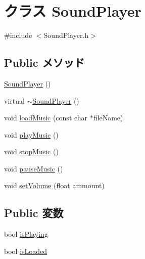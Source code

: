 \hypertarget{class_sound_player}{\section{クラス Sound\-Player}
\label{class_sound_player}
}


{\ttfamily \#include $<$Sound\-Player.\-h$>$}

\subsection*{Public メソッド}
\begin{DoxyCompactItemize}
\item 
\hyperlink{class_sound_player_ac7107aecd54bdcfac29486487768ebc6}{Sound\-Player} ()
\item 
virtual \hyperlink{class_sound_player_a581b10975ea64b87b84b7471b814c7ef}{$\sim$\-Sound\-Player} ()
\item 
void \hyperlink{class_sound_player_a35be4fbb8f85cdb7b809ccf26048bff4}{load\-Music} (const char $\ast$file\-Name)
\item 
void \hyperlink{class_sound_player_a29b399cf0b70dc4aaff0001a2d836dc2}{play\-Music} ()
\item 
void \hyperlink{class_sound_player_a3aa32618112b982a26d19b94678e43e3}{stop\-Music} ()
\item 
void \hyperlink{class_sound_player_a6a8705b6336f19071c97dbc143659847}{pause\-Music} ()
\item 
void \hyperlink{class_sound_player_a76ec7f258014d510338f204acc9d6312}{set\-Volume} (float ammount)
\end{DoxyCompactItemize}
\subsection*{Public 変数}
\begin{DoxyCompactItemize}
\item 
bool \hyperlink{class_sound_player_aceb9f5460765c2ca5876e4d1d9dc6e6b}{is\-Playing}
\item 
bool \hyperlink{class_sound_player_a78dce0843ea727e714eb9ba4d0f2e3d7}{is\-Loaded}
\end{DoxyCompactItemize}


